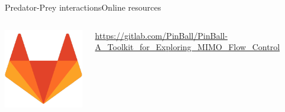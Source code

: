 \documentclass[usenames,dvipsnames,svgnames,10pt,aspectratio=169]{beamer}
\begin{document}
\begin{frame}[t, c]{Predator-Prey interactions}{Online resources}
	  \begin{minipage}{.9\textwidth}
			\begin{columns}
				\begin{column}{.2\textwidth}
					\centering
					\includegraphics[height=.15\textheight]{gitlab}
				\end{column}
				\begin{column}{.7\textwidth}
					\url{https://gitlab.com/PinBall/PinBall-A_Toolkit_for_Exploring_MIMO_Flow_Control}
				\end{column}
			\end{columns}
		\end{minipage}
\end{frame}
\end{document}
